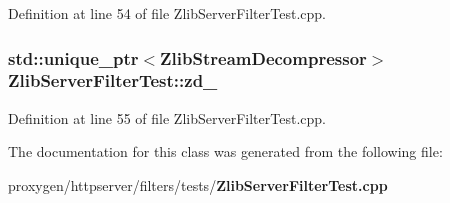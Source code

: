 Definition at line 54 of file Zlib\+Server\+Filter\+Test.\+cpp.

\subsubsection[{zd\+\_\+}]{\setlength{\rightskip}{0pt plus 5cm}std\+::unique\+\_\+ptr$<${\bf Zlib\+Stream\+Decompressor}$>$ Zlib\+Server\+Filter\+Test\+::zd\+\_\+\hspace{0.3cm}{\ttfamily [protected]}}\label{classZlibServerFilterTest_a2547dd3c7203ff15bd08dc3d220de16c}


Definition at line 55 of file Zlib\+Server\+Filter\+Test.\+cpp.



The documentation for this class was generated from the following file\+:\begin{DoxyCompactItemize}
\item 
proxygen/httpserver/filters/tests/{\bf Zlib\+Server\+Filter\+Test.\+cpp}\end{DoxyCompactItemize}
